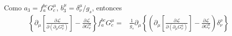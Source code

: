 Como $a_{3}=f_{a}^{bc} G^{\mu}_{c} $, $b_{3}^{\mu}=\delta^{\mu}_{\nu}/g_{s}$, entonces
\begin{align}
  \left\{ \partial_\mu\left[\frac{\partial\mathcal{L}}{\partial\left(\partial_\mu G_\nu^a\right)}\right]-\frac{\partial\mathcal{L}}{\partial G_\nu^a} \right\} f_{a}^{bc} G^{\mu}_{c} =&
\frac{1}{g_s}\partial_{\mu} \left\{\left(   \partial_\mu\left[\frac{\partial\mathcal{L}}{\partial\left(\partial_\mu G_\nu^a\right)}\right]-\frac{\partial\mathcal{L}}{\partial G_\nu^a} \right)\delta_{\nu}^{\rho}  \right\}
\end{align}


\renewcommand{\labelenumi}{\theenumi} %

%
